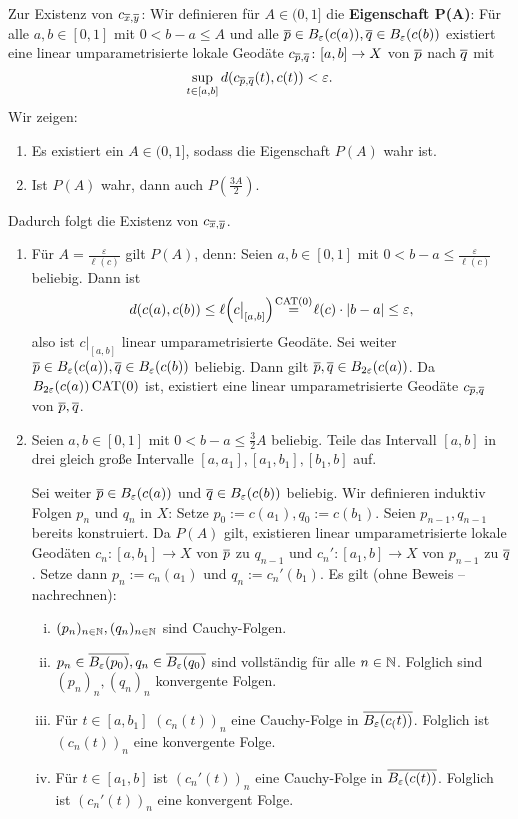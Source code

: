\begin{beweis}
	Zur Existenz von $c_{\overline{x},\overline{y}}$:
	Wir definieren für $A \in (0,1]$ die \textbf{Eigenschaft P(A)}:
	Für alle $a,b \in [0,1]$ mit $0 < b-a \leq A$ und alle $\overline{p} \in B_\varepsilon(c(a)), \overline{q} \in B_\varepsilon(c(b))$ existiert eine linear umparametrisierte lokale Geodäte $c_{\overline{p},\overline{q}} \colon [a,b] \rightarrow X$ von $\overline{p}$ nach $\overline{q}$ mit
	\[
		\sup_{t \in [a,b]} d(c_{\overline{p},\overline{q}}(t),c(t)) < \varepsilon.
	\]
	Wir zeigen:
	\begin{enumerate}[(1)]
		\item Es existiert ein $A \in (0,1]$, sodass die Eigenschaft $P(A)$ wahr ist.
		\item Ist $P(A)$ wahr, dann auch $P(\frac{3A}{2})$.
	\end{enumerate}
	Dadurch folgt die Existenz von $c_{\overline{x},\overline{y}}$.
	
	\begin{enumerate}[(1)]
		\item Für $A = \frac{\varepsilon}{\ell(c)}$ gilt $P(A)$, denn:
		Seien $a,b \in [0,1]$ mit $0 < b-a \leq \frac{\varepsilon}{\ell(c)}$ beliebig.
		Dann ist
		\[
			d(c(a),c(b)) \leq \ell\enbrace*{c \big|_{[a,b]}} \stack{\CAT}{=} \ell(c) \cdot \abs{b-a} \leq \varepsilon,
		\]
		also ist $c\big|_{[a,b]}$ linear umparametrisierte Geodäte.
		Sei weiter $\overline{p} \in B_\varepsilon(c(a)), \overline{q} \in B_\varepsilon(c(b))$ beliebig.
		Dann gilt $\overline{p}, \overline{q} \in B_{2\varepsilon}(c(a))$.
		Da $B_{2\varepsilon}(c(a)) \operatorname{CAT(0)}$ ist, existiert eine linear umparametrisierte Geodäte $c_{\overline{p},\overline{q}}$ von $\overline{p}, \overline{q}$.
		\item Seien $a,b \in [0,1]$ mit $0 < b-a \leq \frac{3}{2}A$ beliebig.
		Teile das Intervall $[a,b]$ in drei gleich große Intervalle $[a,a_1],[a_1,b_1],[b_1,b]$ auf. 		
		
		Sei weiter $\overline{p} \in B_\varepsilon(c(a))$ und $\overline{q} \in B_\varepsilon(c(b))$ beliebig.
		Wir definieren induktiv Folgen $p_n$ und $q_n$ in $X$:
		Setze $p_0 := c(a_1), q_0 := c(b_1)$.
		Seien $p_{n-1}, q_{n-1}$ bereits konstruiert.
		Da $P(A)$ gilt, existieren linear umparametrisierte lokale Geodäten $c_n \colon [a, b_1] \rightarrow X$ von $\overline{p}$ zu $q_{n-1}$ und $c_n' \colon [a_1,b] \rightarrow X$ von $p_{n-1}$ zu $\overline{q}$.
		Setze dann $p_n := c_n(a_1)$ und $q_n := c_n'(b_1)$. Es gilt (ohne Beweis -- nachrechnen):
		\begin{enumerate}[(i)]
			\item $(p_n)_{n \in \mathbb{N}}, (q_n)_{n \in \mathbb{N}}$ sind Cauchy-Folgen.
			\item $p_n \in \overline{B_\varepsilon(p_0)}, q_n \in \overline{B_\varepsilon(q_0)}$ sind vollständig für alle $n \in \mathbb{N}$.
			Folglich sind $(p_n)_n, (q_n)_n$ konvergente Folgen.
			\item Für $t \in [a,b_1]$ $(c_n(t))_n$ eine Cauchy-Folge in $\overline{B_\varepsilon(c_(t))}$.
			Folglich ist $(c_n(t))_n$ eine konvergente Folge.
			\item Für $t \in [a_1,b]$ ist $(c_n'(t))_n$ eine Cauchy-Folge in $\overline{B_\varepsilon(c(t))}$.
			Folglich ist $(c_n'(t))_n$ eine konvergent Folge.
		\end{enumerate}
		

\end{enumerate}
\end{beweis}
